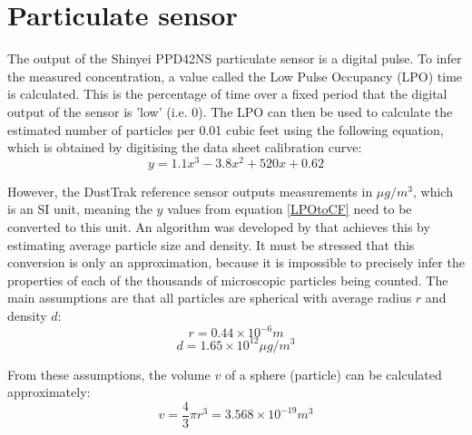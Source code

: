 \documentclass[11pt,twosided,a4paper]{report}
\begin{document}


\section{Particulate sensor}

The output of the Shinyei PPD42NS particulate sensor is a digital pulse. To infer the measured concentration, a value called the Low Pulse Occupancy (LPO) time is calculated. This is the percentage of time over a fixed period that the digital output of the sensor is 'low' (i.e. 0). The LPO can then be used to calculate the estimated number of particles per 0.01 cubic feet using the following equation, which is obtained by digitising the data sheet calibration curve:
\begin{equation}
\label{LPOtoCF}
y = 1.1x^3 - 3.8x^2 + 520x + 0.62
\end{equation}

However, the DustTrak reference sensor outputs measurements in $\mu g/m^3$, which is an SI unit, meaning the $y$ values from equation \ref{LPOtoCF} need to be converted to this unit. An algorithm was developed by \cite{uva2009preliminary} that achieves this by estimating average particle size and density. It must be stressed that this conversion is only an approximation, because it is impossible to precisely infer the properties of each of the thousands of microscopic particles being counted. The main assumptions are that all particles are spherical with average radius $r$ and density $d$:
\begin{equation}
r = 0.44 \times 10^{-6} m
\end{equation}
\begin{equation}
d =  1.65 \times 10^{12} \mu g/m^3
\end{equation}

From these assumptions, the volume $v$ of a sphere (particle) can be calculated approximately:
\begin{equation}
v = \frac{4}{3} \pi r^3 = 3.568 \times 10^{-19} m^3
\end{equation}
\end{document}
